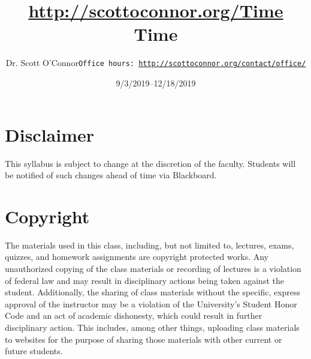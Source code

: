 \documentclass[article,oneside]{memoir}
\def\myauthor{Author}
\def\mytitle{Title}
\def\mycopyright{\myauthor}
\def\myweb{\href{http://scottoconnor.org/Time}{http://scottoconnor.org/Time}}
\def\myauthor{Dr. Scott O'Connor}
\def\mytitle{{\normalsize \myweb \newline} \HUGE Time}
\begin{document}
\setsansfont[Mapping=tex-text]{Myriad Pro} 
\setmonofont[Mapping=tex-text,Scale=0.8]{Georgia} 

\def\ind{\hangindent=1 true cm\hangafter=1 \noindent}
\def\labelitemi{$\cdot$}


\title{\LARGE \mytitle}     
\author{\Large\myauthor \newline \footnotesize\texttt{\noindent Office hours: \href{http://scottoconnor.org/contact/office/}{http://scottoconnor.org/contact/office/}}}
\date{9/3/2019--12/18/2019}


\maketitle




%
%

\section{Disclaimer}
 This syllabus is subject to change at the discretion of the faculty. Students will be notified of such changes ahead of time via Blackboard. 


\section{Copyright}
The materials used in this class, including, but not limited to, lectures, exams, quizzes, and homework assignments are copyright protected works.  Any unauthorized copying of the class materials or recording of lectures is a violation of federal law and may result in disciplinary actions being taken against the student.  Additionally, the sharing of class materials without the specific, express approval of the instructor may be a violation of the University's Student Honor Code and an act of academic dishonesty, which could result in further disciplinary action.  This includes, among other things, uploading class materials to websites for the purpose of sharing those materials with other current or future students. 
\end{document}
